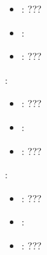 \begin{itemize}
{           \begin{itemize}
                \item \optionPossibleValues{}: ???
                \item \optionDefaultValue{}: 
                \item \optionDescrption{}: ???
           \end{itemize}
    \item {}:
           \begin{itemize}
                \item \optionPossibleValues{}: ???
                \item \optionDefaultValue{}: 
                \item \optionDescrption{}: ???
           \end{itemize}
    \item {}:
           \begin{itemize}
                \item \optionPossibleValues{}: ???
                \item \optionDefaultValue{}: 
                \item \optionDescrption{}: ???
           \end{itemize}
       }
\end{itemize}
